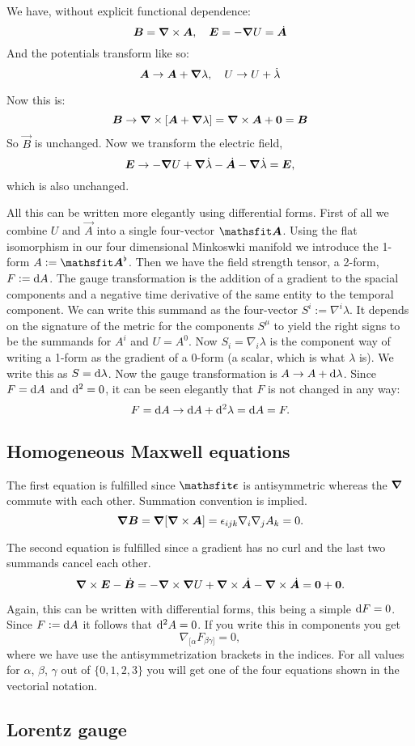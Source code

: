 \documentclass[11pt, ngerman, fleqn, DIV=15, headinclude, BCOR=1cm]{scrartcl}
\begin{document}
We have, without explicit functional dependence:
\[
    \boldsymbol{B} = \boldsymbol{\nabla} \times \boldsymbol{A}
    ,\quad
    \boldsymbol{E} = - \boldsymbol{\nabla} U = \dot{\boldsymbol{A}}
\]
And the potentials transform like so:
\[
    \boldsymbol{A} \to \boldsymbol{A} + \boldsymbol{\nabla} \lambda
    ,\quad
    U \to U + \dot \lambda
\]

Now this is:
\[
    \vec B \to \curl \sbr{\vec A + \vnabla \lambda} = \curl \vec A + \vec 0 =
    \vec B
\]
So $\vec B$ is unchanged. Now we transform the electric field,
\[
    \boldsymbol{E} \to - \boldsymbol{\nabla} U + \boldsymbol{\nabla} \dot \lambda - \dot{\boldsymbol{A}} - \boldsymbol{\nabla} \dot
    \lambda = \boldsymbol{E},
\]
which is also unchanged.

All this can be written more elegantly using differential forms. First of all
we combine $U$ and $\vec A$ into a single four-vector $\tens A$. Using the flat
isomorphism in our four dimensional Minkoswki manifold we introduce the 1-form
$A := \tens A^\flat$. Then we have the field strength tensor, a 2-form, $F :=
\dif A$. The gauge transformation is the addition of a gradient to the spacial
components and a negative time derivative of the same entity to the temporal
component. We can write this summand as the four-vector $S^i := \nabla^i
\lambda$. It depends on the signature of the metric for the components $S^\mu$
to yield the right signs to be the summands for $A^i$ and $U = A^0$. Now $S_i =
\nabla_i \lambda$ is the component way of writing a 1-form as the gradient of a
0-form (a scalar, which is what $\lambda$ is). We write this as $S = \dif
\lambda$. Now the gauge transformation is $A \to A + \dif \lambda$. Since $F =
\dif A$ and $\dif{^2} = 0$, it can be seen elegantly that $F$ is not changed in
any way:
\[
    F = \dif A \to \dif A + \dif{^2} \lambda = \dif A = F.
\]

\subsection{Homogeneous Maxwell equations}

The first equation is fulfilled since $\tens \epsilon$ is antisymmetric whereas
the $\boldsymbol{\nabla}$ commute with each other. Summation convention is implied.
\[
    \boldsymbol{\nabla} \boldsymbol{B} = \boldsymbol{\nabla} [\boldsymbol{\nabla} \times \boldsymbol{A}] = \epsilon_{ijk} \nabla_i
    \nabla_j A_k = 0.
\]

The second equation is fulfilled since a gradient has no curl and the last two
summands cancel each other.
\[
    \boldsymbol{\nabla} \times \boldsymbol{E} - \dot{\boldsymbol{B}} = - \boldsymbol{\nabla} \times \boldsymbol{\nabla} U + \boldsymbol{\nabla} \times \dot{\boldsymbol{A}} - \boldsymbol{\nabla} \times
    \dot{\boldsymbol{A}} = \boldsymbol{0} + \boldsymbol{0}.
\]

Again, this can be written with differential forms, this being a simple $\dif F
= 0$. Since $F := \dif A$ it follows that $\dif{^2} A = 0$. If you write this
in components you get
\[
    \nabla_{[\alpha} F_{\beta\gamma]} = 0,
\]
where we have use the antisymmetrization brackets in the indices. For all
values for $\alpha$, $\beta$, $\gamma$ out of $\{0, 1, 2, 3\}$ you will get one
of the four equations shown in the vectorial notation.

\subsection{Lorentz gauge}
\end{document}
